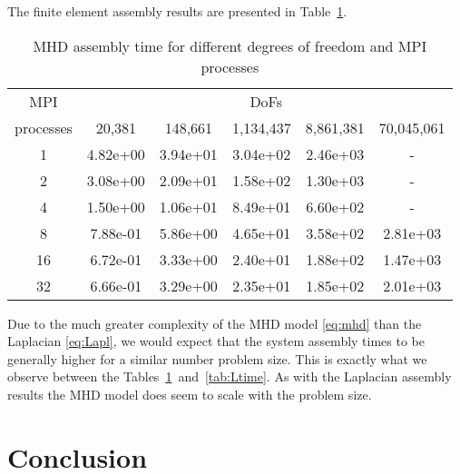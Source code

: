 \documentclass[10pt]{article}
\begin{document}
The finite element assembly results are presented in Table~\ref{tab:MHD}.
\begin{table}[h!]
    \centering
    \begin{tabular}{|c|ccccc|}
        \hline
        MPI & \multicolumn{5}{c|}{DoFs}\\
        processes &  20,381   &   148,661  &   1,134,437  &   8,861,381  & 70,045,061 \\
        \hline
        1 & 4.82e+00 &  3.94e+01 &  3.04e+02 &  2.46e+03 &  - \\
        2 & 3.08e+00 &  2.09e+01 &  1.58e+02 &  1.30e+03 &  - \\
        4 & 1.50e+00 &  1.06e+01 &  8.49e+01 &  6.60e+02 &  - \\
        8 & 7.88e-01 &  5.86e+00 &  4.65e+01 &  3.58e+02 &  2.81e+03 \\
        16 & 6.72e-01 &  3.33e+00 &  2.40e+01 &  1.88e+02 &  1.47e+03 \\
        32 & 6.66e-01 &  3.29e+00 &  2.35e+01 &  1.85e+02 &  2.01e+03 \\
        \hline
    \end{tabular}
    \caption{MHD assembly time for different degrees of freedom and MPI processes}
    \label{tab:MHD}
\end{table}
Due to the much greater complexity of the MHD model \eqref{eq:mhd} than the Laplacian \eqref{eq:Lapl}, we would expect that the system assembly times to be generally higher for a similar number problem size. This is exactly what we observe between the Tables~\ref{tab:MHD}~and~\ref{tab:Ltime}. As with the Laplacian assembly results the MHD model does seem to scale with the problem size.

\section{Conclusion}




\end{document}
